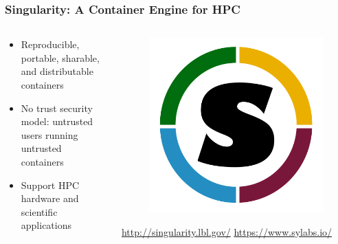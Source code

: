 \documentclass{beamer}
\begin{document}
\begin{frame}
   \frametitle{Singularity: A Container Engine for HPC}
   \begin{columns}
      \begin{column}{0.6\textwidth}
         \begin{itemize}
            \setlength\itemsep{1.0em}
            \item Reproducible, portable, sharable, and distributable 
               containers
            \item No trust security model: untrusted users running 
               untrusted containers
            \item Support HPC hardware and scientific applications
         \end{itemize}
      \end{column}
      \hfill
      \begin{column}{0.5\textwidth}
         \begin{figure}[htbp]
            \includegraphics[width=1.0\textwidth]{images/singularity-logo.png}
         \end{figure}
         \begin{center}\small
            \url{http://singularity.lbl.gov/}
            \url{https://www.sylabs.io/}
         \end{center}
      \end{column}
   \end{columns}
\end{frame}
\end{document}

